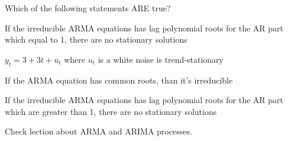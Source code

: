
\begin{question}
Which of the following statements ARE true?
\begin{answerlist}
  \item If the irreducible ARMA equations has lag polynomial roots for the AR part which equal to 1, there are no stationary solutions
  \item \(y_t = 3 + 3t +u_t\) where \(u_t\) is a white noise is trend-stationary
  \item If the ARMA equation has common roots, than it's irreducible
  \item If the irreducible ARMA equations has lag polynomial roots for the AR part which are greater than 1, there are no stationary solutions
\end{answerlist}
\end{question}

\begin{solution}
Check lection about ARMA and ARIMA processes.
\end{solution}

